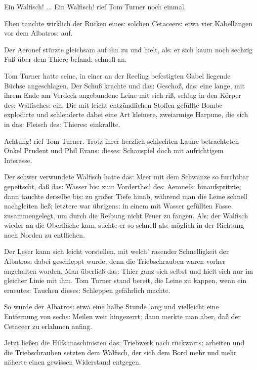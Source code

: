 \documentclass[oneside,12pt]{book}
\newcommand{\s}{s:}
\begin{document}
{\glqq}Ein Walfisch! ... Ein Walfisch!{\grqq} rief Tom Turner noch
einmal.

Eben tauchte wirklich der R\"ucken eine{\s} solchen Cetaceer{\s} etwa
vier Kabell\"angen vor dem {\glqq}Albatro{\s}{\grqq} auf.

Der Aeronef st\"urzte gleichsam auf ihn zu und hielt, al{\s} er sich
kaum noch sechzig Fu{\ss} \"uber dem Thiere befand, schnell an.

Tom Turner hatte seine, in einer an der Reeling befestigten Gabel
liegende B\"uchse angeschlagen. Der Schu{\ss} krachte und da{\s}
Gescho{\ss}, da{\s} eine lange, mit ihrem Ende am Verdeck angebundene
Leine mit sich ri{\ss}, schlug in den K\"orper de{\s} Walfische{\s}
ein. Die mit leicht ent\/z\"undlichen Stoffen gef\"ullte Bombe
explodirte und schleuderte dabei eine Art kleinere, zweiarmige
Harpune, die sich in da{\s} Fleisch de{\s} Thiere{\s} einkrallte.

{\glqq}Achtung!{\grqq} rief Tom Turner. Trotz ihrer herzlich
schlechten Laune betrachteten Onkel Prudent und Phil Evan{\s}
diese{\s} Schauspiel doch mit aufrichtigem Interesse.

Der schwer verwundete Walfisch hatte da{\s} Meer mit dem Schwanze so
furchtbar gepeitscht, da{\ss} da{\s} Wasser bi{\s} zum Vordertheil
de{\s} Aeronef{\s} hinaufspritzte; dann tauchte derselbe bi{\s} zu
gro{\ss}er Tiefe hinab, w\"ahrend man die Leine schnell nachgleiten
lie{\ss}; letztere war \"ubrigen{\s} in einem mit Wasser gef\"ullten
Fasse zusammengelegt, um durch die Reibung nicht Feuer zu fangen.
Al{\s} der Walfisch wieder an die Oberfl\"ache kam, suchte er so
schnell al{\s} m\"oglich in der Richtung nach Norden zu entfliehen.

Der Leser kann sich leicht vorstellen, mit welch' rasender
Schnelligkeit der {\glqq}Albatro{\s}{\grqq} dabei geschleppt wurde,
denn die Triebschrauben waren vorher angehalten worden. Man
\"uberlie{\ss} da{\s} Thier ganz sich selbst und hielt sich nur im
gleicher Linie mit ihm. Tom Turner stand bereit, die Leine zu kappen,
wenn ein erneute{\s} Tauchen diese{\s} Schleppen gef\"ahrlich machte.

So wurde der {\glqq}Albatro{\s}{\grqq} etwa eine halbe Stunde lang
und vielleicht eine Entfernung von sech{\s} Meilen weit hingezerrt;
dann merkte man aber, da{\ss} der Cetaceer zu erlahmen anfing.

Jetzt lie{\ss}en die Hilf{\s}maschinisten da{\s} Triebwerk nach
r\"uckw\"art{\s} arbeiten und die Triebschrauben setzten dem
Walfisch, der sich dem Bord mehr und mehr n\"aherte einen gewissen
Widerstand entgegen.
\end{document}
